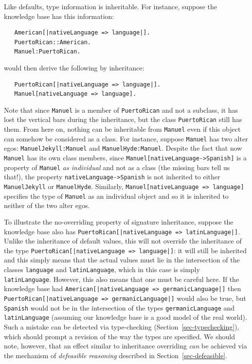 \documentclass[11pt]{article}
\newcommand{\ERGO}{\mbox{\smaller{\ensuremath{\cal{E}}\smaller{{\sc{RGO}}}}}\xspace}
\newcommand{\FLSYSTEM}{\ERGO}
\begin{document}
Like defaults,
type information is inheritable. For instance, suppose the knowledge base
has this information:
\begin{verbatim}
   American[|nativeLanguage => language|].
   PuertoRican::American.
   Manuel:PuertoRican.
\end{verbatim}
\FLSYSTEM would then derive the following by inheritance:
\begin{verbatim}
   PuertoRican[|nativeLanguage => language|].
   Manuel[nativeLanguage => language].
\end{verbatim}
Note that since \texttt{Manuel} is a member of \texttt{PuertoRican} and not
a subclass, it has lost the vertical bars during the inheritance, but the class
\texttt{PuertoRican} still has them.  From here on,
nothing can be inheritable from \texttt{Manuel} even if this object can somehow
be considered as a class. For instance, suppose \texttt{Manuel} has
two alter egos:  \texttt{ManuelJekyll:Manuel} and
\texttt{ManuelHyde:Manuel}. Despite the fact that now \texttt{Manuel}
has its own class members, since
\texttt{Manuel[nativeLanguage->Spanish]} is a property of \texttt{Manuel}
\emph{as individual} and not as a class (the missing bars tell us that!),
the property \texttt{nativeLanguage->Spanish}
is not inherited to either \texttt{ManuelJekyll} or \texttt{ManuelHyde}.
Similarly, \texttt{Manuel[nativeLanguage => language]} specifies the type
of \texttt{Manuel}  as an individual object and so it is inherited to
neither of the two alter egos.  

To illustrate the no-overriding property of signature inheritance, suppose
the knowledge base also has \texttt{PuertoRican[|nativeLanguage =>
  latinLanguage|]}. Unlike the inheritance of default values, this will not
override the inheritance of the type
\texttt{PuertoRican[|nativeLanguage => language|]}: it will still be
inherited and this simply means that
the actual values must lie in the intersection of the classes
\texttt{language} and \texttt{latinLanguage}, which in this case is simply
\texttt{latinLanguage}. However, this also means that one must be careful
here. If the knowledge base had
\texttt{American[|nativeLanguage => germanicLanguage|]} then
\texttt{PuertoRican[|nativeLanguage => germanicLanguage|]} would also be
true, but \texttt{Spanish} would not be in the intersection of
the types \texttt{germanicLanguage} and \texttt{latinLanguage} (assuming
our knowledge base is a good model of the real world).   
Such a mistake can be detected via type-checking
(Section~\ref{sec-typechecking}), which should prompt a revision of the way
the types are specified.
We should note, however, that an effect similar to inheritance overriding
\emph{can} be achieved via the mechanism of \emph{defeasible reasoning}    
described in Section~\ref{sec-defeasible}.
\end{document}

